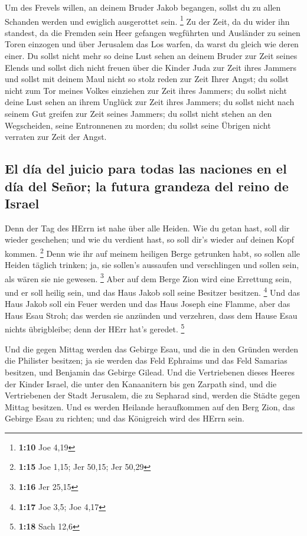  Um des Frevels willen, an deinem Bruder Jakob begangen,
sollst du zu allen Schanden werden und ewiglich ausgerottet sein.
\footnote{\textbf{1:10} Joe 4,19}  Zu der Zeit, da du
wider ihn standest, da die Fremden sein Heer gefangen wegführten und
Ausländer zu seinen Toren einzogen und über Jerusalem das Los warfen, da
warst du gleich wie deren einer.  Du sollst nicht mehr so
deine Lust sehen an deinem Bruder zur Zeit seines Elends und sollst dich
nicht freuen über die Kinder Juda zur Zeit ihres Jammers und sollst mit
deinem Maul nicht so stolz reden zur Zeit Ihrer Angst; 
du sollst nicht zum Tor meines Volkes einziehen zur Zeit ihres Jammers;
du sollst nicht deine Lust sehen an ihrem Unglück zur Zeit ihres
Jammers; du sollst nicht nach seinem Gut greifen zur Zeit seines
Jammers;  du sollst nicht stehen an den Wegscheiden,
seine Entronnenen zu morden; du sollst seine Übrigen nicht verraten zur
Zeit der Angst.

\hypertarget{el-duxeda-del-juicio-para-todas-las-naciones-en-el-duxeda-del-seuxf1or-la-futura-grandeza-del-reino-de-israel}{%
\subsection{El día del juicio para todas las naciones en el día del
Señor; la futura grandeza del reino de
Israel}\label{el-duxeda-del-juicio-para-todas-las-naciones-en-el-duxeda-del-seuxf1or-la-futura-grandeza-del-reino-de-israel}}

 Denn der Tag des HErrn ist nahe über alle Heiden. Wie du
getan hast, soll dir wieder geschehen; und wie du verdient hast, so soll
dir's wieder auf deinen Kopf kommen. \footnote{\textbf{1:15} Joe 1,15;
  Jer 50,15; Jer 50,29}  Denn wie ihr auf meinem heiligen
Berge getrunken habt, so sollen alle Heiden täglich trinken; ja, sie
sollen's aussaufen und verschlingen und sollen sein, als wären sie nie
gewesen. \footnote{\textbf{1:16} Jer 25,15}  Aber auf dem
Berge Zion wird eine Errettung sein, und er soll heilig sein, und das
Haus Jakob soll seine Besitzer besitzen. \footnote{\textbf{1:17} Joe
  3,5; Joe 4,17}  Und das Haus Jakob soll ein Feuer
werden und das Haus Joseph eine Flamme, aber das Haus Esau Stroh; das
werden sie anzünden und verzehren, dass dem Hause Esau nichts
übrigbleibe; denn der HErr hat's geredet. \footnote{\textbf{1:18} Sach
  12,6}

 Und die gegen Mittag werden das Gebirge Esau, und die in
den Gründen werden die Philister besitzen; ja sie werden das Feld
Ephraims und das Feld Samarias besitzen, und Benjamin das Gebirge
Gilead.  Und die Vertriebenen dieses Heeres der Kinder
Israel, die unter den Kanaanitern bis gen Zarpath sind, und die
Vertriebenen der Stadt Jerusalem, die zu Sepharad sind, werden die
Städte gegen Mittag besitzen.  Und es werden Heilande
heraufkommen auf den Berg Zion, das Gebirge Esau zu richten; und das
Königreich wird des HErrn sein.
